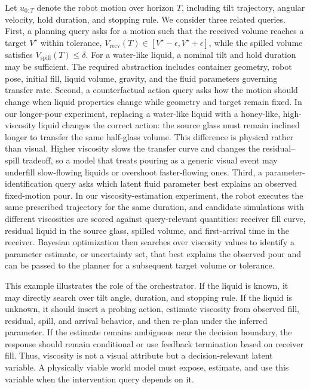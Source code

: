 \documentclass{article}
\begin{document}
Let $u_{0:T}$ denote the robot motion over horizon $T$, including tilt trajectory, angular velocity, hold duration, and stopping rule. We consider three related queries. First, a planning query asks for a motion such that the received volume reaches a target $V^\star$ within tolerance,
$V_{\mathrm{recv}}(T)\in[V^\star-\epsilon,V^\star+\epsilon]$, while the spilled volume satisfies $V_{\mathrm{spill}}(T)\leq\delta$. For a water-like liquid, a nominal tilt and hold duration may be sufficient. The required abstraction includes container geometry, robot pose, initial fill, liquid volume, gravity, and the fluid parameters governing transfer rate. Second, a counterfactual action query asks how the motion should change when liquid properties change while geometry and target remain fixed. In our longer-pour experiment, replacing a water-like liquid with a honey-like, high-viscosity liquid changes the correct action: the source glass must remain inclined longer to transfer the same half-glass volume. This difference is physical rather than visual. Higher viscosity slows the transfer curve and changes the residual--spill tradeoff, so a model that treats pouring as a generic visual event may underfill slow-flowing liquids or overshoot faster-flowing ones. Third, a parameter-identification query asks which latent fluid parameter best explains an observed fixed-motion pour. In our viscosity-estimation experiment, the robot executes the same prescribed trajectory for the same duration, and candidate simulations with different viscosities are scored against query-relevant quantities: receiver fill curve, residual liquid in the source glass, spilled volume, and first-arrival time in the receiver. Bayesian optimization then searches over viscosity values to identify a parameter estimate, or uncertainty set, that best explains the observed pour and can be passed to the planner for a subsequent target volume or tolerance.

This example illustrates the role of the orchestrator. If the liquid is known, it may directly search over tilt angle, duration, and stopping rule. If the liquid is unknown, it should insert a probing action, estimate viscosity from observed fill, residual, spill, and arrival behavior, and then re-plan under the inferred parameter. If the estimate remains ambiguous near the decision boundary, the response should remain conditional or use feedback termination based on receiver fill. Thus, viscosity is not a visual attribute but a decision-relevant latent variable. A physically viable world model must expose, estimate, and use this variable when the intervention query depends on it.
\end{document}
